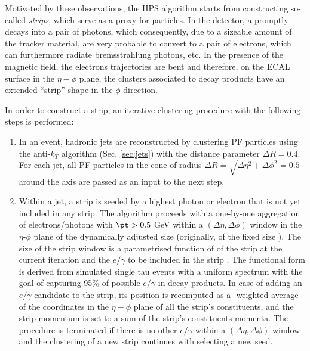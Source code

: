 Motivated by these observations, the HPS algorithm starts from constructing so-called \textit{strips}, which serve as a proxy for \piz particles. In the detector, a \piz promptly decays into a pair of photons, which consequently, due to a sizeable amount of the tracker material, are very probable to convert to a pair of electrons, which can furthermore radiate bremsstrahlung photons, etc. In the presence of the magnetic field, the electrons trajectories are bent and therefore, on the ECAL surface in the $\eta-\phi$ plane, the clusters associated to \piz decay products have an extended \enquote{strip} shape in the $\phi$ direction.

In order to construct a strip, an iterative clustering procedure with the following steps is performed:

\begin{enumerate}
    \item In an event, hadronic jets are reconstructed by clustering PF particles using the anti-$k_T$ algorithm \cite{Cacciari:2008gp} (Sec. \ref{sec:jets}) with the distance parameter $\Delta R = 0.4$. For each jet, all PF particles in the cone of radius $\Delta R = \sqrt{\Delta \eta^2 + \Delta  \phi^2} = 0.5$ around the axis are passed as an input to the next step. 
    \item Within a jet, a strip is seeded by a highest \pt photon or electron that is not yet included in any strip. The algorithm proceeds with a one-by-one aggregation of electrons/photons with $\pt > 0.5$ GeV within a $(\Delta \eta, \Delta  \phi)$ window in the $\eta$-$\phi$ plane of the dynamically adjusted size (originally, of the fixed size \cite{CMS:2015pac}). The size of the strip window is a parametrised function of \pt of the strip at the current iteration and the $e/\gamma$ to be included in the strip \cite{CMS:2018jrd}. The functional form is derived from simulated single tau events with a uniform \pt spectrum with the goal of capturing 95\% of possible $e/\gamma$ in \tauh decay products. In case of adding an $e/\gamma$ candidate to the strip, its position is recomputed as a \pt-weighted average of the coordinates in the $\eta-\phi$ plane of all the strip’s constituents, and the strip momentum is set to a sum of the strip’s constituents momenta. The procedure is terminated if there is no other $e/\gamma$ within a $(\Delta \eta, \Delta  \phi)$ window and the clustering of a new strip continues with selecting a new seed.

\end{enumerate}
